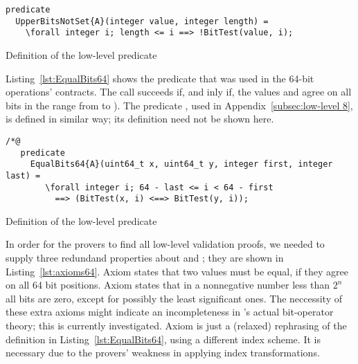\begin{listing}[hbt]
\begin{minipage}{0.99\textwidth}
\begin{lstlisting}[style=acsl-block]
predicate
  UpperBitsNotSet{A}(integer value, integer length) =
    \forall integer i; length <= i ==> !BitTest(value, i);
\end{lstlisting}
\end{minipage}
\caption{\label{lst:UpperBitsNotSet integer}
	Definition of the low-level predicate }
\end{listing}


Listing~\ref{lst:EqualBits64} shows the predicate
 that was used in the 64-bit
operations' contracts.
%
The call  succeeds if, and inly
if, the  values   and  
agree on all bits in the range from  to ).
%
The predicate , used in
Appendix~\ref{subsec:low-level 8}, is defined in similar way; its
definition need not be shown here.










\begin{listing}[hbt]
\begin{minipage}{0.99\textwidth}
\begin{lstlisting}[style=acsl-block]
/*@
   predicate
     EqualBits64{A}(uint64_t x, uint64_t y, integer first, integer last) =
        \forall integer i; 64 - last <= i < 64 - first 
          ==> (BitTest(x, i) <==> BitTest(y, i));
\end{lstlisting}
\end{minipage}
\caption{\label{lst:EqualBits64}
        Definition of the low-level predicate }
\end{listing}








In order for the provers to find all low-level validation proofs, we
needed to supply three redundand properties about
 and ; they are shown
in Listing~\ref{lst:axioms64}.
%
Axiom  states that two 
values must be equal, if they agree on all 64 bit positions.
%
Axiom  states that in a nonnegative number
less than $2^n$ all bits are zero, except for possibly
the least significant  ones.
%
The neccessity of these extra axioms might indicate an
incompleteness in \framac's actual bit-operator theory; this is currently
investigated.
%
Axiom  is just a (relaxed)
rephrasing of the definition
in Listing~\ref{lst:EqualBits64}, using a different index scheme.
%
It is necessary due to the provers' weakness in applying index
transformations.










